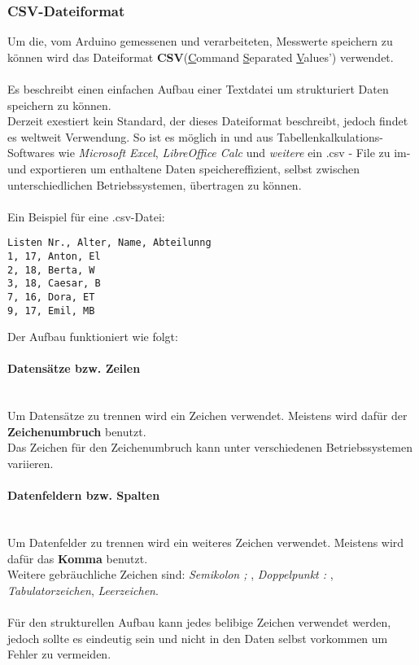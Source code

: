 \documentclass[12pt,a4paper]{article}
\begin{document}
\subsubsection*{CSV-Dateiformat}
Um die, vom Arduino gemessenen und verarbeiteten, Messwerte speichern zu können wird das 
Dateiformat {\bf CSV}(\underline{C}ommand \underline{S}eparated \underline{V}alues') verwendet. \\\\
%
Es beschreibt einen einfachen Aufbau einer Textdatei um strukturiert Daten speichern zu können. \\
Derzeit exestiert kein Standard, der dieses Dateiformat beschreibt, jedoch findet es weltweit Verwendung. 
So ist es möglich in und aus Tabellenkalkulations-Softwares wie {\it Microsoft Excel}, {\it LibreOffice Calc} 
und {\it weitere} ein .csv - File zu im- und exportieren um enthaltene Daten speichereffizient, selbst 
zwischen unterschiedlichen Betriebssystemen, übertragen zu können. \\\\
%
Ein Beispiel für eine .csv-Datei:
\begin{lstlisting}[frame=single]
Listen Nr., Alter, Name, Abteilunng
1, 17, Anton, El
2, 18, Berta, W
3, 18, Caesar, B
7, 16, Dora, ET
9, 17, Emil, MB
\end{lstlisting}
%
\vspace{10mm}
Der Aufbau funktioniert wie folgt:
%
\paragraph{Datensätze bzw. Zeilen}\mbox{}\\
Um Datensätze zu trennen wird ein Zeichen verwendet. Meistens wird dafür der {\bf Zeichenumbruch} benutzt. \\
Das Zeichen für den Zeichenumbruch kann unter verschiedenen Betriebssystemen variieren. 
%
\paragraph{Datenfeldern bzw. Spalten}\mbox{}\\
Um Datenfelder  zu trennen wird ein weiteres Zeichen verwendet. Meistens wird dafür das {\bf Komma} benutzt. \\
Weitere gebräuchliche Zeichen sind: {\it Semikolon ; }, {\it Doppelpunkt : }, {\it Tabulatorzeichen}, {\it Leerzeichen}. \\\\
%
Für den strukturellen Aufbau kann jedes belibige Zeichen verwendet werden, 
jedoch sollte es eindeutig sein und nicht in den Daten selbst vorkommen um Fehler zu vermeiden. 
%
\end{document}
